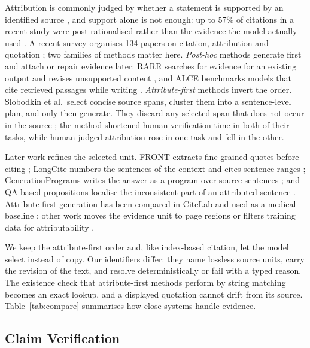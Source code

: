 \documentclass[runningheads]{llncs}
\begin{document}
Attribution is commonly judged by whether a statement is supported by an identified source
\cite{rashkin2023ais}, and support alone is not enough: up to 57\% of citations in a recent study were
post-rationalised rather than the evidence the model actually used \cite{wallat2025faithfulness}. A recent
survey organises 134 papers on citation, attribution and quotation \cite{schreieder2025survey}; two
families of methods matter here.
\emph{Post-hoc} methods generate first and attach or repair evidence later: RARR searches for
evidence for an existing output and revises unsupported content \cite{gao2023rarr}, and ALCE
benchmarks models that cite retrieved passages while writing \cite{gao2023alce}. \emph{Attribute-first}
methods invert the order. Slobodkin et al.\ select concise source spans, cluster them into a
sentence-level plan, and only then generate. They discard any selected span that does not occur in the
source \cite{slobodkin2024afg}; the method shortened human verification time in both of their tasks,
while human-judged attribution rose in one task and fell in the other.

Later work refines the selected unit. FRONT extracts fine-grained quotes before citing
\cite{huang2024front}; LongCite numbers the sentences of the context and cites sentence ranges
\cite{zhang2025longcite}; GenerationPrograms writes the answer as a program over source sentences
\cite{wan2025generationprograms}; and QA-based propositions localise the inconsistent part of an
attributed sentence \cite{cattan2026localizing}. Attribute-first generation has been
compared in CiteLab \cite{shen2025citelab} and used
as a medical baseline \cite{wu2025medgraphrag}; other work moves the evidence unit to page regions
\cite{zhao2025finragbenchv} or filters training data for attributability \cite{schimanski2024specialists}.

We keep the attribute-first order and, like index-based citation, let the model select instead of
copy. Our identifiers differ: they name lossless source units, carry the revision of the text, and
resolve deterministically or fail with a typed reason. The existence check that attribute-first methods
perform by string matching becomes an exact lookup, and a displayed quotation cannot drift from its
source. Table~\ref{tab:compare} summarises how close systems handle evidence.

\subsection{Claim Verification}
\end{document}
